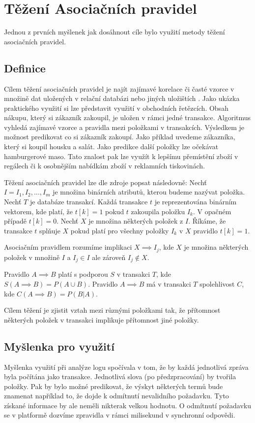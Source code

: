 \documentclass[thesis=M,czech]{FITthesis}[2012/10/20]
\begin{document}
		
	\section{Těžení Asociačních pravidel}
		Jednou z prvních myšlenek jak dosáhnout cíle bylo využití metody těžení asociačních pravidel. 
		
		\subsection{Definice}
		Cílem těžení asociačních pravidel je najít zajímavé korelace či časté vzorce v množině dat uložených v relační databázi nebo jiných uložištích \cite{assoc1}. Jako ukázka praktického využití si lze představit využití v obchodních řetězcích. Obsah nákupu, který si zákazník zakoupil, je uložen v rámci jedné transakce. Algoritmus vyhledá zajímavé vzorce a pravidla mezi položkami v transakcích. Výsledkem je možnost predikovat co si zákazník zakoupí. Jako příklad uvedeme zákazníka, který si koupil housku a salát. Jako predikce další položky lze očekávat hamburgerové maso. Tato znalost pak lze využít k lepšímu přemístění zboží v regálech či k osobnějším nabídkám zboží v reklamních tiskovinách.
		
		Těžení asociačních pravidel lze dle zdroje \cite{AsocAgrawal1} popsat následovně: Nechť $I = I_1, I_2,\ldots,I_m$ je množina binárních atributů, kterou budeme nazývat položka. Nechť $T$ je databáze transakcí. Každá transakce $t$ je reprezentována binárním vektorem, kde platí, že $t[k] = 1$ pokud $t$ zakoupila položku $I_k$. V opačném případě $t[k] = 0$. Nechť $X$  je množina některých položek z $I$. Říkáme, že transakce $t$ splňuje $X$ pokud platí pro všechny položky $I_k$ v $X$ pravidlo $t[k] = 1$.	
			
		Asociačním pravidlem rozumíme implikaci $X \implies I_j$, kde $X$ je množina některých položek v množině $I$ a $I_j \in I$ ale zároveň $I_j \notin X$.
		
		Pravidlo $A \implies B$ platí s podporou $S$ v transakci $T$, kde $S(A \implies B) = P(A \cup B)$. Pravidlo $A \implies B$ má v transakci $T$ spolehlivost $C$, kde $C(A \implies B) = P(B|A)$.
		
		Cílem těžení je zjistit vztah mezi různými položkami tak, že přítomnost některých položek v transakci implikuje přítomnost jiné položky.
		
		\subsection{Myšlenka pro využití}
		Myšlenka využití při analýze logu spočívala v tom, že by každá jednotlivá zpráva byla počítána jako transakce. Jednotlivá slova (po předzpracování) by tvořila položky. Pak by bylo možné predikovat, že výskyt některých termů bude znamenat například to, že dojde k odmítnutí nevalidního požadavku. Tyto získané informace by ale neměli nikterak velkou hodnotu. O odmítnutí požadavku se v platformě dozvíme zpravidla v rámci milisekund v synchronní odpovědi.
		
\end{document}
